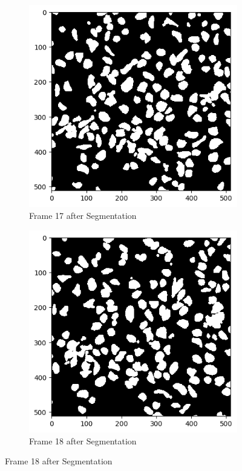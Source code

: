 \documentclass{article}
\begin{document}
\begin{figure}[h!]
  \begin{subfigure}{0.4\textwidth}
    \includegraphics[width=\linewidth]{Report/Appendix_Images/Segmentation-B-Growth/frame_17.png}
    \caption*{Frame 17 after Segmentation}
  \end{subfigure}
  \hfill
  \begin{subfigure}{0.4\textwidth}
    \includegraphics[width=\linewidth]{Report/Appendix_Images/Segmentation-B-Growth/frame_18.png}
    \caption*{Frame 18 after Segmentation}
  \end{subfigure}
\end{figure}
\end{document}
